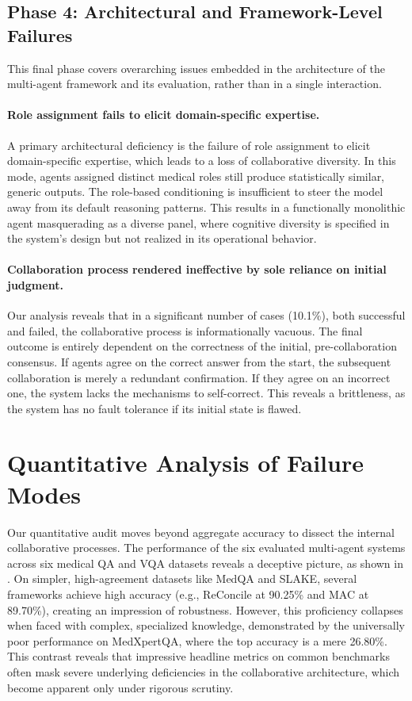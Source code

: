 \documentclass{article}
\begin{document}
\subsection{Phase 4: Architectural and Framework-Level Failures}
This final phase covers overarching issues embedded in the architecture of the multi-agent framework and its evaluation, rather than in a single interaction.

\paragraph{Role assignment fails to elicit domain-specific expertise.}
A primary architectural deficiency is the failure of role assignment to elicit domain-specific expertise, which leads to a loss of collaborative diversity. In this mode, agents assigned distinct medical roles still produce statistically similar, generic outputs. The role-based conditioning is insufficient to steer the model away from its default reasoning patterns. This results in a functionally monolithic agent masquerading as a diverse panel, where cognitive diversity is specified in the system's design but not realized in its operational behavior.

\paragraph{Collaboration process rendered ineffective by sole reliance on initial judgment.}
Our analysis reveals that in a significant number of cases (10.1\%), both successful and failed, the collaborative process is informationally vacuous. The final outcome is entirely dependent on the correctness of the initial, pre-collaboration consensus. If agents agree on the correct answer from the start, the subsequent collaboration is merely a redundant confirmation. If they agree on an incorrect one, the system lacks the mechanisms to self-correct. This reveals a brittleness, as the system has no fault tolerance if its initial state is flawed.

\section{Quantitative Analysis of Failure Modes}
Our quantitative audit moves beyond aggregate accuracy to dissect the internal collaborative processes. The performance of the six evaluated multi-agent systems across six medical QA and VQA datasets reveals a deceptive picture, as shown in . On simpler, high-agreement datasets like MedQA and SLAKE, several frameworks achieve high accuracy (e.g., ReConcile at 90.25\% and MAC at 89.70\%), creating an impression of robustness. However, this proficiency collapses when faced with complex, specialized knowledge, demonstrated by the universally poor performance on MedXpertQA, where the top accuracy is a mere 26.80\%. This contrast reveals that impressive headline metrics on common benchmarks often mask severe underlying deficiencies in the collaborative architecture, which become apparent only under rigorous scrutiny.
\end{document}
